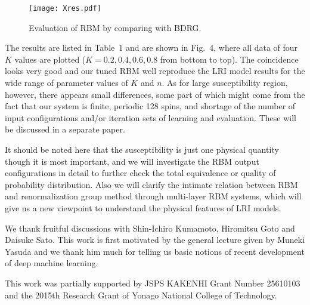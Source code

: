 \documentclass[a4paper,preprint,superscriptaddress,preprintnumbers,nofootinbib]{revtex4}
\begin{document}
\begin{figure}[htbp]
    \texttt{[image: Xres.pdf]}
    \caption{Evaluation of RBM by comparing with BDRG.}       
    \label{fig:BDRGcomparison}
\end{figure}

The results are listed in Table~1 and are 
shown in Fig.~4, where all data of four $K$ values
are plotted ($K=0.2, 0.4, 0.6, 0.8$ from bottom to top). 
The coincidence looks very good and our tuned RBM well
reproduce the LRI model results for the wide range of
parameter values of $K$ and $n$.
As for large susceptibility region, however, there appears small 
differences, some part of which might come from the fact
that our system is finite, periodic 128 spins, and shortage of
the number of input configurations and/or iteration sets
 of 
learning and evaluation. These will be discussed in a separate
paper.

It should be noted here that
the susceptibility is just one physical 
quantity though it is most important, and we will investigate 
the RBM output configurations in detail to further check the total
equivalence or quality of probability distribution.
Also we will clarify the intimate relation between
RBM and renormalization group method through 
multi-layer RBM systems, which will give us a new viewpoint to
understand the physical features of LRI models.
 
We thank fruitful discussions with Shin-Ichiro Kumamoto,
Hiromitsu Goto and Daisuke Sato. 
This work is first motivated by the general
lecture given by Muneki Yasuda
and we thank him much for telling us basic notions
of recent development of deep machine learning.

This work was partially supported by 
JSPS KAKENHI Grant Number 25610103
and the 2015th Research Grant of Yonago National College of Technology.
\end{document}
